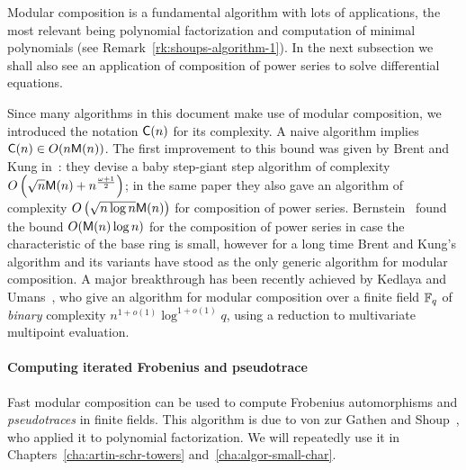 Modular composition is a fundamental algorithm with lots of
applications, the most relevant being polynomial
factorization\cite{vzgathen+shoup92,kaltofen+shoup98} and computation
of minimal polynomials (see Remark~\ref{rk:shoups-algorithm-1}). In
the next subsection we shall also see an application of composition of
power series to solve differential equations.

Since many algorithms in this document make use of modular
composition, we introduced the notation $\mathsf{C}(n)$ for its
complexity. A naive algorithm implies $\mathsf{C}(n)\in
O(n\mathsf{M}(n))$. The first improvement to this bound was given by Brent
and Kung in~\cite{brent+kung}: they devise a baby step-giant step
algorithm of complexity $O\left(\sqrt{n}\mathsf{M}(n) +
  n^{\frac{\omega+1}{2}}\right)$; in the same paper they also gave an
algorithm of complexity $O\left(\sqrt{n\log n}\mathsf{M}(n)\right)$ for
composition of power series. Bernstein~\cite{bernstein98} found the
bound $O(\mathsf{M}(n)\log n)$ for the composition of power series in case
the characteristic of the base ring is small, however for a long time
Brent and Kung's algorithm and its
variants\cite{huang+pan98,kaltofen+shoup98} have stood as the only
generic algorithm for modular composition. A major breakthrough has
been recently achieved by Kedlaya and
Umans~\cite{umans:08,kedlaya+umans08}, who give an algorithm for
modular composition over a finite field $\mathbb{F}_q$ of \emph{binary}
complexity $n^{1+o(1)}\log^{1+o(1)}q$, using a reduction to
multivariate multipoint evaluation.


\paragraph{Computing iterated Frobenius and pseudotrace}
\label{sec:comp-frob-trace}
Fast modular composition can be used to compute Frobenius
automorphisms and \emph{pseudotraces} in finite fields. This algorithm
is due to von zur Gathen and Shoup~\cite{vzgathen+shoup92}, who
applied it to polynomial factorization. We will repeatedly use it in
Chapters~\ref{cha:artin-schr-towers} and~\ref{cha:algor-small-char}.


